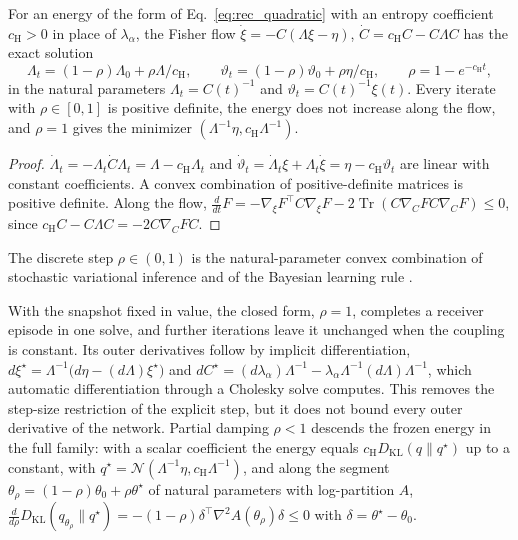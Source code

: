 \documentclass[twoside,11pt]{article}
\begin{document}
\begin{proposition}
\label{prop:rec_flow}
For an energy of the form of Eq.~\eqref{eq:rec_quadratic} with an entropy coefficient $c_{\mathrm H}>0$ in place of $\lambda_\alpha$, the Fisher flow $\dot\xi=-C(\Lambda\xi-\eta)$, $\dot C=c_{\mathrm H}C-C\Lambda C$ has the exact solution
\begin{equation}
\Lambda_t=(1-\rho)\Lambda_0+\rho\Lambda/c_{\mathrm H},\qquad
\vartheta_t=(1-\rho)\vartheta_0+\rho\eta/c_{\mathrm H},\qquad
\rho=1-e^{-c_{\mathrm H}t},
\label{eq:rec_flow}
\end{equation}
in the natural parameters $\Lambda_t=C(t)^{-1}$ and $\vartheta_t=C(t)^{-1}\xi(t)$. Every iterate with $\rho\in[0,1]$ is positive definite, the energy does not increase along the flow, and $\rho=1$ gives the minimizer $(\Lambda^{-1}\eta,c_{\mathrm H}\Lambda^{-1})$.
\end{proposition}
\begin{proof}
$\dot\Lambda_t=-\Lambda_t\dot C\Lambda_t=\Lambda-c_{\mathrm H}\Lambda_t$ and $\dot\vartheta_t=\dot\Lambda_t\xi+\Lambda_t\dot\xi=\eta-c_{\mathrm H}\vartheta_t$ are linear with constant coefficients. A convex combination of positive-definite matrices is positive definite. Along the flow, $\tfrac{d}{dt}F=-\nabla_\xi F^\top C\nabla_\xi F-2\operatorname{Tr}(C\nabla_CFC\nabla_CF)\le0$, since $c_{\mathrm H}C-C\Lambda C=-2C\nabla_CFC$.
\end{proof}
The discrete step $\rho\in(0,1)$ is the natural-parameter convex combination of stochastic variational inference \citep{Hoffman2013} and of the Bayesian learning rule \citep{KhanRue2023}.

With the snapshot fixed in value, the closed form, $\rho=1$, completes a receiver episode in one solve, and further iterations leave it unchanged when the coupling is constant. Its outer derivatives follow by implicit differentiation, $d\xi^\star=\Lambda^{-1}\bigl(d\eta-(d\Lambda)\xi^\star\bigr)$ and $dC^\star=(d\lambda_\alpha)\Lambda^{-1}-\lambda_\alpha\Lambda^{-1}(d\Lambda)\Lambda^{-1}$, which automatic differentiation through a Cholesky solve computes. This removes the step-size restriction of the explicit step, but it does not bound every outer derivative of the network. Partial damping $\rho<1$ descends the frozen energy in the full family: with a scalar coefficient the energy equals $c_{\mathrm H}D_{\mathrm{KL}}(q\|q^\star)$ up to a constant, with $q^\star=\mathcal N(\Lambda^{-1}\eta,c_{\mathrm H}\Lambda^{-1})$, and along the segment $\theta_\rho=(1-\rho)\theta_0+\rho\theta^\star$ of natural parameters with log-partition $A$, $\tfrac{d}{d\rho}D_{\mathrm{KL}}(q_{\theta_\rho}\|q^\star)=-(1-\rho)\delta^\top\nabla^2A(\theta_\rho)\delta\le0$ with $\delta=\theta^\star-\theta_0$.
\end{document}
